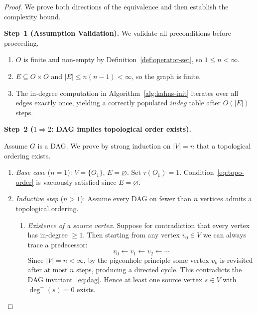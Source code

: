 \documentclass[12pt,openany]{book}
\numberwithin{equation}{chapter}
\theoremstyle{plain}
\theoremstyle{definition}
\theoremstyle{remark}
\numberwithin{equation}{chapter}
\theoremstyle{plain}
\newcommand{\calO}{\mathcal{O}}
\def\calO{O}%
\begin{document}
\begin{proof}
We prove both directions of the equivalence and then establish the
complexity bound.

\medskip
\noindent\textbf{Step~1 (Assumption Validation).}
We validate all preconditions before proceeding.
\begin{enumerate}
  \item $\calO$ is finite and non-empty by
        Definition~\ref{def:operator-set}, so $1 \leq n < \infty$.
  \item $E \subseteq \calO \times \calO$ and $|E| \leq n(n-1) < \infty$,
        so the graph is finite.
  \item The in-degree computation in Algorithm~\ref{alg:kahns-init}
        iterates over all edges exactly once, yielding a correctly
        populated $\mathit{indeg}$ table after $O(|E|)$ steps.
\end{enumerate}

\medskip
\noindent\textbf{Step~2 ($1 \Rightarrow 2$: DAG implies topological order
exists).}

Assume $G$ is a DAG.  We prove by strong induction on $|V| = n$ that a
topological ordering exists.

\begin{enumerate}
  \item \emph{Base case} ($n = 1$): $V = \{O_1\}$, $E = \varnothing$.
        Set $\tau(O_1) = 1$.  Condition~\eqref{eq:topo-order} is
        vacuously satisfied since $E = \varnothing$.

  \item \emph{Inductive step} ($n > 1$): Assume every DAG on fewer than
        $n$ vertices admits a topological ordering.

        \begin{enumerate}
          \item \emph{Existence of a source vertex.}
                Suppose for contradiction that every vertex has
                in-degree $\geq 1$.  Then starting from any vertex
                $v_0 \in V$ we can always trace a predecessor:
                \begin{equation}
                  v_0 \leftarrow v_1 \leftarrow v_2 \leftarrow \cdots
                  \label{eq:pred-chain}
                \end{equation}
                Since $|V| = n < \infty$, by the pigeonhole principle
                some vertex $v_k$ is revisited after at most $n$ steps,
                producing a directed cycle.  This contradicts the DAG
                invariant~\eqref{eq:dag}.  Hence at least one source
                vertex $s \in V$ with $\deg^{-}(s) = 0$ exists.


\end{enumerate}
\end{enumerate}
\end{proof}
\end{document}
